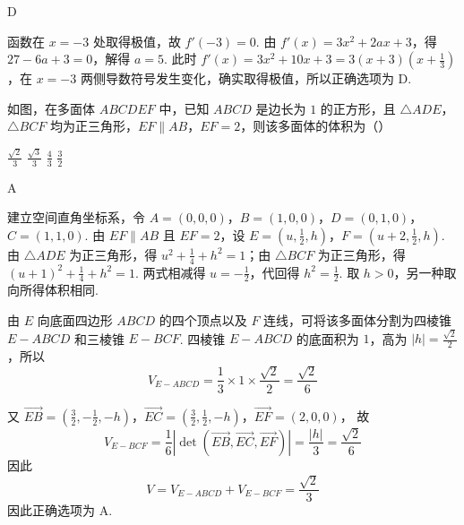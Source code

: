\begin{answer}
D
\end{answer}

\begin{solution}
函数在 \(x=-3\) 处取得极值，故 \(f'(-3)=0\). 由 \(f'(x)=3x^{2}+2ax+3\)，得 \(27-6a+3=0\)，解得 \(a=5\). 此时 \(f'(x)=3x^{2}+10x+3=3(x+3)(x+\frac{1}{3})\)，在 \(x=-3\) 两侧导数符号发生变化，确实取得极值，所以正确选项为 D.
\end{solution}

\begin{problem}
如图，在多面体 \(ABCDEF\) 中，已知 \(ABCD\) 是边长为 \(1\) 的正方形，且 \(\triangle ADE\)，\(\triangle BCF\) 均为正三角形，\(EF \parallel AB\)，\(EF=2\)，则该多面体的体积为（\quad）

\begin{center}
\end{center}

\choices
    {\(\frac{\sqrt{2}}{3}\)}
    {\(\frac{\sqrt{3}}{3}\)}
    {\(\frac{4}{3}\)}
    {\(\frac{3}{2}\)}
\end{problem}

\begin{answer}
A
\end{answer}

\begin{solution}
建立空间直角坐标系，令 \(A=(0,0,0)\)，\(B=(1,0,0)\)，\(D=(0,1,0)\)，\(C=(1,1,0)\). 由 \(EF\parallel AB\) 且 \(EF=2\)，设 \(E=(u,\frac{1}{2},h)\)，\(F=(u+2,\frac{1}{2},h)\). 由 \(\triangle ADE\) 为正三角形，得 \(u^{2}+\frac{1}{4}+h^{2}=1\)；由 \(\triangle BCF\) 为正三角形，得 \((u+1)^{2}+\frac{1}{4}+h^{2}=1\). 两式相减得 \(u=-\frac{1}{2}\)，代回得 \(h^{2}=\frac{1}{2}\).  取 \(h>0\)，另一种取向所得体积相同.

由 \(E\) 向底面四边形 \(ABCD\) 的四个顶点以及 \(F\) 连线，可将该多面体分割为四棱锥 \(E-ABCD\) 和三棱锥 \(E-BCF\). 四棱锥 \(E-ABCD\) 的底面积为 \(1\)，高为 \(|h|=\frac{\sqrt{2}}{2}\)，所以
\[
V_{E-ABCD}=\frac{1}{3}\times1\times\frac{\sqrt{2}}{2}=\frac{\sqrt{2}}{6}
\]

又
\(\overrightarrow{EB}=\left(\frac{3}{2},-\frac{1}{2},-h\right)\)，\(\overrightarrow{EC}=\left(\frac{3}{2},\frac{1}{2},-h\right)\)，\(\overrightarrow{EF}=(2,0,0)\)，
故
\[
V_{E-BCF}=\frac{1}{6}\left|\det(\overrightarrow{EB},\overrightarrow{EC},\overrightarrow{EF})\right|=\frac{|h|}{3}=\frac{\sqrt{2}}{6}
\]
因此
\[
V=V_{E-ABCD}+V_{E-BCF}=\frac{\sqrt{2}}{3}
\]
因此正确选项为 A.
\end{solution}

